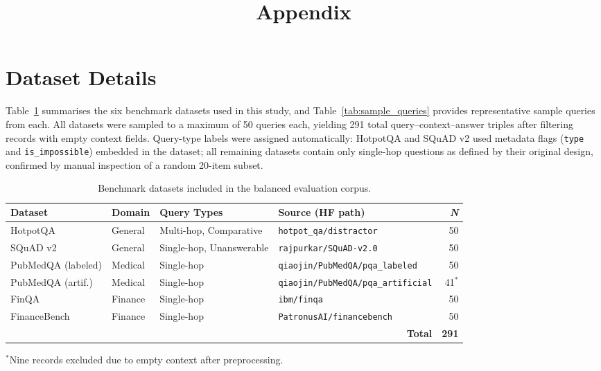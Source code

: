 \documentclass[12pt]{article}
\title{Appendix}
\author{}
\date{}
\begin{document}
\maketitle
\tableofcontents
\newpage

\appendix

\section{Dataset Details}
\label{app:datasets}

Table~\ref{tab:datasets} summarises the six benchmark datasets used in this study, and Table~\ref{tab:sample_queries} provides representative sample queries from each.
All datasets were sampled to a maximum of 50 queries each, yielding 291 total
query--context--answer triples after filtering records with empty context fields.
Query-type labels were assigned automatically: HotpotQA and SQuAD v2 used
metadata flags (\texttt{type} and \texttt{is\_impossible}) embedded in the
dataset; all remaining datasets contain only single-hop questions as defined by
their original design, confirmed by manual inspection of a random 20-item subset.

\begin{table}[h]
\centering
\caption{Benchmark datasets included in the balanced evaluation corpus.}
\label{tab:datasets}
\begin{tabular}{llllr}
\toprule
\textbf{Dataset} & \textbf{Domain} & \textbf{Query Types} & \textbf{Source (HF path)} & \textbf{\textit{N}} \\
\midrule
HotpotQA           & General & Multi-hop, Comparative   & \texttt{hotpot\_qa/distractor}              & 50 \\
SQuAD v2           & General & Single-hop, Unanswerable & \texttt{rajpurkar/SQuAD-v2.0}               & 50 \\
PubMedQA (labeled) & Medical & Single-hop               & \texttt{qiaojin/PubMedQA/pqa\_labeled}      & 50 \\
PubMedQA (artif.)  & Medical & Single-hop               & \texttt{qiaojin/PubMedQA/pqa\_artificial}   & 41$^{*}$ \\
FinQA              & Finance & Single-hop               & \texttt{ibm/finqa}                          & 50 \\
FinanceBench       & Finance & Single-hop               & \texttt{PatronusAI/financebench}            & 50 \\
\midrule
\multicolumn{4}{r}{\textbf{Total}} & \textbf{291} \\
\bottomrule
\end{tabular}

\smallskip
{\small $^{*}$Nine records excluded due to empty context after preprocessing.}
\end{table}
\end{document}
